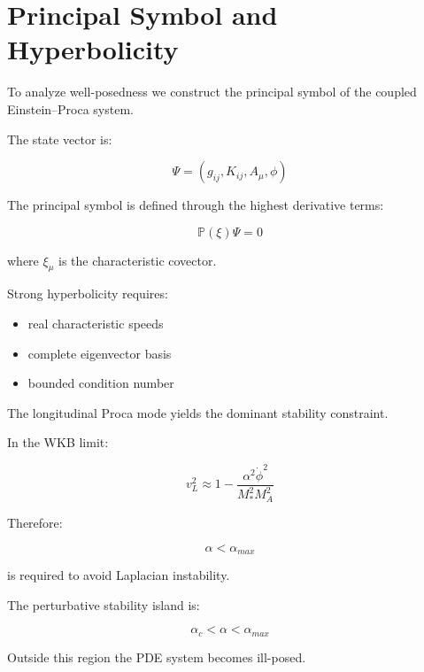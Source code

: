 \section{Principal Symbol and Hyperbolicity}

To analyze well-posedness we construct the principal symbol of the coupled Einstein--Proca system.

The state vector is:

\begin{equation}
\Psi = (g_{ij},K_{ij},A_\mu,\phi)
\end{equation}

The principal symbol is defined through the highest derivative terms:

\begin{equation}
\mathbb P(\xi) \Psi = 0
\end{equation}

where \(\xi_\mu\) is the characteristic covector.

Strong hyperbolicity requires:

\begin{itemize}
\item real characteristic speeds
\item complete eigenvector basis
\item bounded condition number
\end{itemize}

The longitudinal Proca mode yields the dominant stability constraint.

In the WKB limit:

\begin{equation}
v_L^2
\approx
1
-
\frac{\alpha^2 \dot\phi^2}{M_*^2 M_A^2}
\end{equation}

Therefore:

\begin{equation}
\alpha < \alpha_{max}
\end{equation}

is required to avoid Laplacian instability.

The perturbative stability island is:

\begin{equation}
\alpha_c < \alpha < \alpha_{max}
\end{equation}

Outside this region the PDE system becomes ill-posed.
